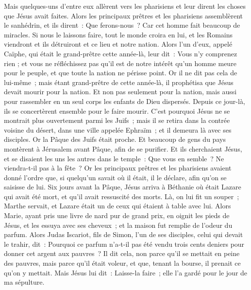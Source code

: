 \begin{multicols}{2}
Mais quelques-uns d'entre eux allèrent vers les pharisiens et leur dirent les choses que Jésus avait faites.
Alors les principaux prêtres et les pharisiens assemblèrent le sanhédrin, et ils dirent~: Que ferons-nous~? Car cet homme fait beaucoup de miracles.
Si nous le laissons faire, tout le monde croira en lui, et les Romains viendront et ils détruiront et ce lieu et notre nation.
Alors l'un d'eux, appelé Caïphe, qui était le grand-prêtre cette année-là, leur dit~: Vous n'y comprenez rien ;
et vous ne réfléchissez pas qu'il est de notre intérêt qu'un homme meure pour le peuple, et que toute la nation ne périsse point.
Or il ne dit pas cela de lui-même~; mais étant grand-prêtre de cette année-là, il prophétisa que Jésus devait mourir pour la nation.
Et non pas seulement pour la nation, mais aussi pour rassembler en un seul corps les enfants de Dieu dispersés.
Depuis ce jour-là, ils se concertèrent ensemble pour le faire mourir.
C'est pourquoi Jésus ne se montrait plus ouvertement parmi les Juifs~; mais il se retira dans la contrée voisine du désert, dans une ville appelée Ephraïm~; et il demeura là avec ses disciples.
Or la Pâque des Juifs était proche. Et beaucoup de gens du pays montèrent à Jérusalem avant Pâque, afin de se purifier.
Et ils cherchaient Jésus, et se disaient les uns les autres dans le temple~: Que vous en semble~? Ne viendra-t-il pas à la fête~?
Or les principaux prêtres et les pharisiens avaient donné l'ordre que, si quelqu'un savait où il était, il le déclare, afin qu'on se saisisse de lui.
\VerseOne{}Six jours avant la Pâque, Jésus arriva à Béthanie où était Lazare qui avait été mort, et qu'il avait ressuscité des morts.
Là, on lui fit un souper~; Marthe servait, et Lazare était un de ceux qui étaient à table avec lui.
Alors Marie, ayant pris une livre de nard pur de grand prix, en oignit les pieds de Jésus, et les essuya avec ses cheveux~; et la maison fut remplie de l'odeur du parfum.
Alors Judas Iscariot, fils de Simon, l'un de ses disciples, celui qui devait le trahir, dit~:
Pourquoi ce parfum n'a-t-il pas été vendu trois cents deniers pour donner cet argent aux pauvres~?
Il dit cela, non parce qu'il se mettait en peine des pauvres, mais parce qu'il était voleur, et que, tenant la bourse, il prenait ce qu'on y mettait.
Mais Jésus lui dit~: Laisse-la faire~; elle l'a gardé pour le jour de ma sépulture.

\end{multicols}

